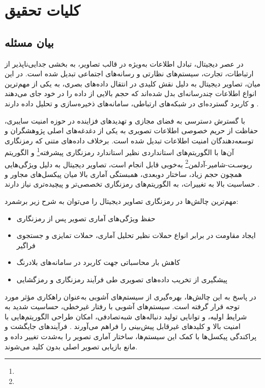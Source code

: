 
\chapter{کلیات تحقیق}
\section{بيان مسئله}

در عصر دیجیتال، تبادل اطلاعات به‌ویژه در قالب تصاویر، به بخشی جدایی‌ناپذیر از ارتباطات، تجارت، سیستم‌های نظارتی و رسانه‌های اجتماعی تبدیل شده است. در این میان، تصاویر دیجیتال به دلیل نقش کلیدی در انتقال داده‌های بصری، به یکی از مهم‌ترین انواع اطلاعات چندرسانه‌ای بدل شده‌اند که حجم بالایی از داده را در خود جای می‌دهند و کاربرد گسترده‌ای در شبکه‌های ارتباطی، سامانه‌های ذخیره‌سازی و تحلیل داده دارند \cite{ref1}.

با گسترش دسترسی به فضای مجازی و تهدیدهای فزاینده در حوزه امنیت سایبری، حفاظت از حریم خصوصی اطلاعات تصویری به یکی از دغدغه‌های اصلی پژوهشگران و توسعه‌دهندگان امنیت اطلاعات تبدیل شده است. برخلاف داده‌های متنی که رمزنگاری آن‌ها با الگوریتم‌های استانداردی نظیر استاندارد رمزنگاری پیشرفته\footnote{} و الگوریتم ریوسـت-شامیر-آدلمن\footnote{} به‌خوبی قابل انجام است، تصاویر دیجیتال به دلیل ویژگی‌هایی همچون حجم زیاد، ساختار دوبعدی، همبستگی آماری بالا میان پیکسل‌های مجاور و حساسیت بالا به تغییرات، به الگوریتم‌های رمزنگاری تخصصی‌تر و پیچیده‌تری نیاز دارند \cite{ref2, ref3}.

مهم‌ترین چالش‌ها در رمزنگاری تصاویر دیجیتال را می‌توان به شرح زیر برشمرد:

\begin{itemize}
    \item حفظ ویژگی‌های آماری تصویر پس از رمزنگاری
    \item ایجاد مقاومت در برابر انواع حملات نظیر تحلیل آماری، حملات تمایزی و جستجوی فراگیر
    \item کاهش بار محاسباتی جهت کاربرد در سامانه‌های بلادرنگ
    \item پیشگیری از تخریب داده‌های تصویری طی فرآیند رمزنگاری و رمزگشایی
\end{itemize}

در پاسخ به این چالش‌ها، بهره‌گیری از سیستم‌های آشوبی به‌عنوان راهکاری مؤثر مورد توجه قرار گرفته است. سیستم‌های آشوبی با رفتار غیرخطی، حساسیت شدید به شرایط اولیه، و توانایی تولید دنباله‌های شبه‌تصادفی، امکان طراحی الگوریتم‌هایی با امنیت بالا و کلیدهای غیرقابل پیش‌بینی را فراهم می‌آورند \cite{ref4}. فرآیندهای جایگشت و پراکندگی پیکسل‌ها با کمک این سیستم‌ها، ساختار آماری تصویر را به‌شدت تغییر داده و مانع بازیابی تصویر اصلی بدون کلید می‌شوند.

